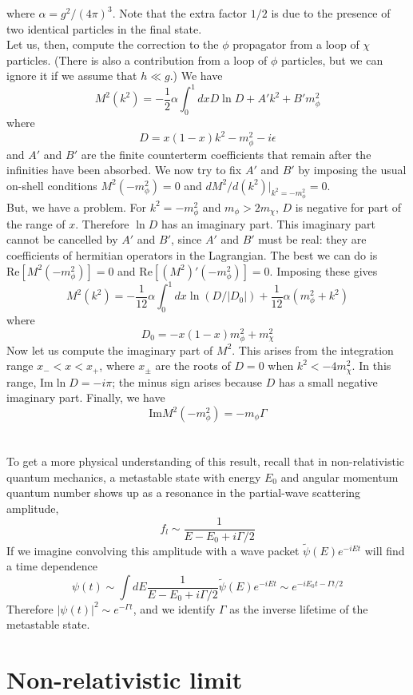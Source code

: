 where $\alpha = g^2/(4\pi)^3$.
Note that the extra factor $1/2$ is due to the presence of two identical particles in the final state.
\\
Let us, then, compute the correction to the $\phi$ propagator from a loop of $\chi$ particles. (There is also a contribution from a loop of $\phi$ particles, but we can ignore it if we assume that $h \ll g$.) We have
\[M^2(k^2) = -\frac{1}{2}\alpha \int_0^1 dx D\ln D + A'k^2 + B'm_{\phi}^2\]
where
\[D = x(1-x)k^2 - m_{\phi}^2 - i\epsilon\]
and $A'$ and $B'$ are the finite counterterm coefficients that remain after the infinities have been absorbed. 
We now try to fix $A'$ and $B'$ by imposing the usual on-shell conditions $M^2(-m_{\phi}^2) = 0$ and $d M^2 / d(k^2)|_{k^2=-m_{\phi}^2} = 0$.
\\
But, we have a problem. For $k^2 = -m_{\phi}^2$ and $m_{\phi} > 2m_{\chi}$, $D$ is negative for part of the range of $x$. Therefore $\ln D$ has an imaginary part. 
This imaginary part cannot be cancelled by $A'$ and $B'$, since $A'$ and $B'$ must be real: they are coefficients of hermitian operators in the Lagrangian. 
The best we can do is $\mathrm{Re}[M^2(-m_{\phi}^2)] = 0$ and $\mathrm{Re}[(M^2)'(-m_{\phi}^2)] = 0$. Imposing these gives
\[M^2(k^2) = -\frac{1}{12}\alpha \int_0^1 dx \ln(D/|D_0|) + \frac{1}{12}\alpha(m_{\phi}^2 + k^2)\]
where
\[D_0 = -x(1-x)m_{\phi}^2 + m_{\chi}^2\]
Now let us compute the imaginary part of $M^2$. 
This arises from the integration range $x_- < x < x_+$, where $x_{\pm}$ are the roots of $D = 0$ when $k^2 < -4m_{\chi}^2$. 
In this range, $\mathrm{Im} \ln D = -i \pi$; the minus sign
arises because $D$ has a small negative imaginary part. Finally, we have
\[\mathrm{Im} M^2(-m_{\phi}^2) = -m_{\phi} \Gamma\]
\\ \\
To get a more physical understanding of this result, recall that in non-relativistic quantum mechanics, a metastable state with energy $E_0$ and angular momentum quantum number shows up as a resonance in the partial-wave scattering amplitude,
\[f_l \sim \frac{1}{E - E_0 + i\Gamma/2}\]
If we imagine convolving this amplitude with a wave packet $\tilde{\psi}(E)e^{-iEt}$ will find a time dependence
\[\psi(t) \sim \int dE \frac{1}{E-E_0+i\Gamma/2} \tilde{\psi}(E)e^{-iEt} \sim e^{-iE_0 t - \Gamma t /2}\]
Therefore $|\psi(t)|^2 \sim e^{-\Gamma t}$, and we identify $\Gamma$ as the inverse lifetime of the metastable state.

\section{Non-relativistic limit}
